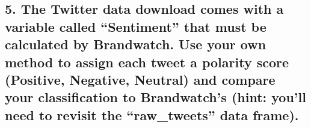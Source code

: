\documentclass[
]{article}
\newenvironment{Shaded}{\begin{snugshade}}{\end{snugshade}}
\newcommand{\AttributeTok}[1]{\textcolor[rgb]{0.77,0.63,0.00}{#1}}
\newcommand{\CommentTok}[1]{\textcolor[rgb]{0.56,0.35,0.01}{\textit{#1}}}
\newcommand{\FunctionTok}[1]{\textcolor[rgb]{0.00,0.00,0.00}{#1}}
\newcommand{\NormalTok}[1]{#1}
\newcommand{\OtherTok}[1]{\textcolor[rgb]{0.56,0.35,0.01}{#1}}
\newcommand{\SpecialCharTok}[1]{\textcolor[rgb]{0.00,0.00,0.00}{#1}}
\begin{document}
\hypertarget{the-twitter-data-download-comes-with-a-variable-called-sentiment-that-must-be-calculated-by-brandwatch.-use-your-own-method-to-assign-each-tweet-a-polarity-score-positive-negative-neutral-and-compare-your-classification-to-brandwatchs-hint-youll-need-to-revisit-the-raw_tweets-data-frame.}{%
\subsection{5. The Twitter data download comes with a variable called
``Sentiment'' that must be calculated by Brandwatch. Use your own method
to assign each tweet a polarity score (Positive, Negative, Neutral) and
compare your classification to Brandwatch's (hint: you'll need to
revisit the ``raw\_tweets'' data
frame).}\label{the-twitter-data-download-comes-with-a-variable-called-sentiment-that-must-be-calculated-by-brandwatch.-use-your-own-method-to-assign-each-tweet-a-polarity-score-positive-negative-neutral-and-compare-your-classification-to-brandwatchs-hint-youll-need-to-revisit-the-raw_tweets-data-frame.}}

\begin{Shaded}
\end{Shaded}
\end{document}
